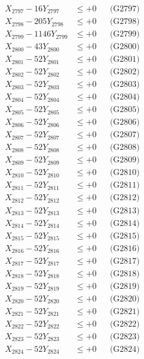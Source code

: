 \documentclass[a4paper,10pt]{article}
\begin{document}
{\begin{align}
X_{2797} - 16Y_{2797} &\leq +0 && \text{(G2797)} \\
X_{2798} - 205Y_{2798} &\leq +0 && \text{(G2798)} \\
X_{2799} - 1146Y_{2799} &\leq +0 && \text{(G2799)} \\
X_{2800} - 43Y_{2800} &\leq +0 && \text{(G2800)} \\
\allowbreak
X_{2801} - 52Y_{2801} &\leq +0 && \text{(G2801)} \\
X_{2802} - 52Y_{2802} &\leq +0 && \text{(G2802)} \\
X_{2803} - 52Y_{2803} &\leq +0 && \text{(G2803)} \\
X_{2804} - 52Y_{2804} &\leq +0 && \text{(G2804)} \\
X_{2805} - 52Y_{2805} &\leq +0 && \text{(G2805)} \\
X_{2806} - 52Y_{2806} &\leq +0 && \text{(G2806)} \\
X_{2807} - 52Y_{2807} &\leq +0 && \text{(G2807)} \\
X_{2808} - 52Y_{2808} &\leq +0 && \text{(G2808)} \\
X_{2809} - 52Y_{2809} &\leq +0 && \text{(G2809)} \\
X_{2810} - 52Y_{2810} &\leq +0 && \text{(G2810)} \\
\allowbreak
X_{2811} - 52Y_{2811} &\leq +0 && \text{(G2811)} \\
X_{2812} - 52Y_{2812} &\leq +0 && \text{(G2812)} \\
X_{2813} - 52Y_{2813} &\leq +0 && \text{(G2813)} \\
X_{2814} - 52Y_{2814} &\leq +0 && \text{(G2814)} \\
X_{2815} - 52Y_{2815} &\leq +0 && \text{(G2815)} \\
X_{2816} - 52Y_{2816} &\leq +0 && \text{(G2816)} \\
X_{2817} - 52Y_{2817} &\leq +0 && \text{(G2817)} \\
X_{2818} - 52Y_{2818} &\leq +0 && \text{(G2818)} \\
X_{2819} - 52Y_{2819} &\leq +0 && \text{(G2819)} \\
X_{2820} - 52Y_{2820} &\leq +0 && \text{(G2820)} \\
\allowbreak
X_{2821} - 52Y_{2821} &\leq +0 && \text{(G2821)} \\
X_{2822} - 52Y_{2822} &\leq +0 && \text{(G2822)} \\
X_{2823} - 52Y_{2823} &\leq +0 && \text{(G2823)} \\
X_{2824} - 52Y_{2824} &\leq +0 && \text{(G2824)} \\

\end{align}}
\end{document}
